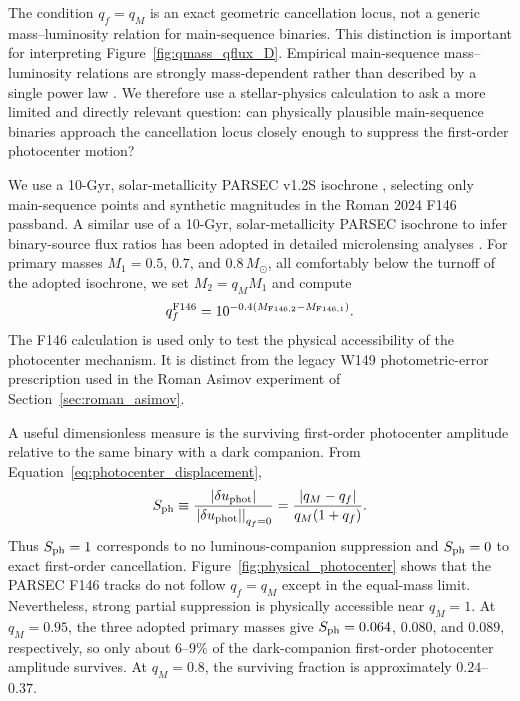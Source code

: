 \documentclass{article}
\begin{document}
The condition $q_f=q_M$ is an exact geometric cancellation locus, not a
generic mass--luminosity relation for main-sequence binaries. This
distinction is important for interpreting Figure~\ref{fig:qmass_qflux_D}.
Empirical main-sequence mass--luminosity relations are strongly
mass-dependent rather than described by a single power law
\citep{Eker2018}. We therefore use a stellar-physics calculation to ask a
more limited and directly relevant question: can physically plausible
main-sequence binaries approach the cancellation locus closely enough to
suppress the first-order photocenter motion?

We use a 10-Gyr, solar-metallicity PARSEC v1.2S isochrone
\citep{Bressan2012}, selecting only main-sequence points and synthetic
magnitudes in the Roman 2024 F146 passband. A similar use of a 10-Gyr,
solar-metallicity PARSEC isochrone to infer binary-source flux ratios has
been adopted in detailed microlensing analyses \citep{Miyazaki2020}. For
primary masses $M_1=0.5$, $0.7$, and $0.8\,M_\odot$, all comfortably below
the turnoff of the adopted isochrone, we set $M_2=q_M M_1$ and compute
\begin{equation}
q_f^{\rm F146}
=
10^{-0.4\left(M_{{\rm F146},2}-M_{{\rm F146},1}\right)}.
\label{eq:qf_f146}
\end{equation}
The F146 calculation is used only to test the physical accessibility of
the photocenter mechanism. It is distinct from the legacy W149
photometric-error prescription used in the Roman Asimov experiment of
Section~\ref{sec:roman_asimov}.

A useful dimensionless measure is the surviving first-order photocenter
amplitude relative to the same binary with a dark companion. From
Equation~\ref{eq:photocenter_displacement},
\begin{equation}
S_{\rm ph}
\equiv
\frac{|\delta u_{\rm phot}|}
{\left.|\delta u_{\rm phot}|\right|_{q_f=0}}
=
\frac{|q_M-q_f|}{q_M(1+q_f)}.
\label{eq:S_ph}
\end{equation}
Thus $S_{\rm ph}=1$ corresponds to no luminous-companion suppression and
$S_{\rm ph}=0$ to exact first-order cancellation.
Figure~\ref{fig:physical_photocenter} shows that the PARSEC F146 tracks do
not follow $q_f=q_M$ except in the equal-mass limit. Nevertheless, strong
partial suppression is physically accessible near $q_M=1$. At
$q_M=0.95$, the three adopted primary masses give
$S_{\rm ph}=0.064$, $0.080$, and $0.089$, respectively, so only about
$6$--$9\%$ of the dark-companion first-order photocenter amplitude
survives. At $q_M=0.8$, the surviving fraction is approximately
$0.24$--$0.37$.
\end{document}
